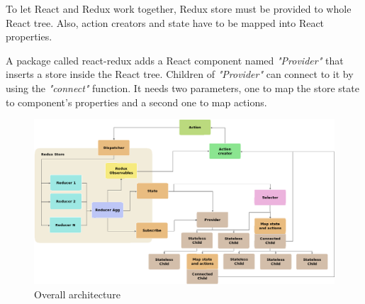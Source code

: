 To let React and Redux work together, Redux store must be provided to whole
React tree. Also, action creators and state have to be mapped into React
properties.

A package called react-redux adds a React component named \textit{"Provider"}
that inserts a store inside the React tree. Children of \textit{"Provider"} can
connect to it by using the \textit{"connect"} function. It needs two 
parameters, one to map the store state to component's properties and a second 
one to map actions.

\begin{landscape}
\begin{figure}[htp]
	\begin{center}
		\includegraphics[width=1.3\textwidth]
		{./figures/overall-architecture.png}

		\caption{Overall architecture}
		\label{F:overall-architecture}
	\end{center}
\end{figure}
\end{landscape}





